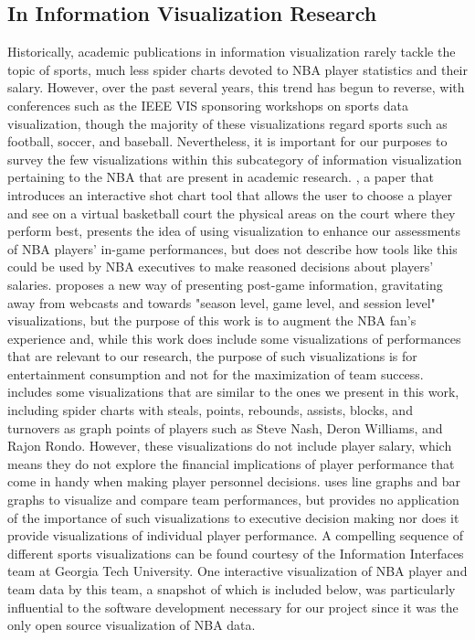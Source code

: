 \documentclass[journal]{vgtc}                %
\begin{document}
\subsection{In Information Visualization Research}
Historically, academic publications in information visualization rarely tackle the topic of sports, much less spider charts devoted to NBA player statistics and their salary. However, over the past several years, this trend has begun to reverse, with conferences such as the IEEE VIS sponsoring workshops on sports data visualization, though the majority of these visualizations regard sports such as football, soccer, and baseball. Nevertheless, it is important for our purposes to survey the few visualizations within this subcategory of information visualization pertaining to the NBA that are present in academic research. \cite{chu}, a paper that introduces an interactive shot chart tool that allows the user to choose a player and see on a virtual basketball court the physical areas on the court where they perform best, presents the idea of using visualization to enhance our assessments of NBA players' in-game performances, but does not describe how tools like this could be used by NBA executives to make reasoned decisions about players' salaries. \cite{chen} proposes a new way of presenting post-game information, gravitating away from webcasts and towards "season level, game level, and session level" visualizations, but the purpose of this work is to augment the NBA fan's experience and, while this work does include some visualizations of performances that are relevant to our research, the purpose of such visualizations is for entertainment consumption and not for the maximization of team success. \cite{pagno} includes some visualizations that are similar to the ones we present in this work, including spider charts with steals, points, rebounds, assists, blocks, and turnovers as graph points of players such as Steve Nash, Deron Williams, and Rajon Rondo. However, these visualizations do not include player salary, which means they do not explore the financial implications of player performance that come in handy when making player personnel decisions. \cite{reyna} uses line graphs and bar graphs to visualize and compare team performances, but provides no application of the importance of such visualizations to executive decision making nor does it provide visualizations of individual player performance. A compelling sequence of different sports visualizations can be found courtesy of the Information Interfaces team at Georgia Tech University. One interactive visualization of NBA player and team data by this team, a snapshot of which is included below, was particularly influential to the software development necessary for our project since it was the only open source visualization of NBA data.
\end{document}
